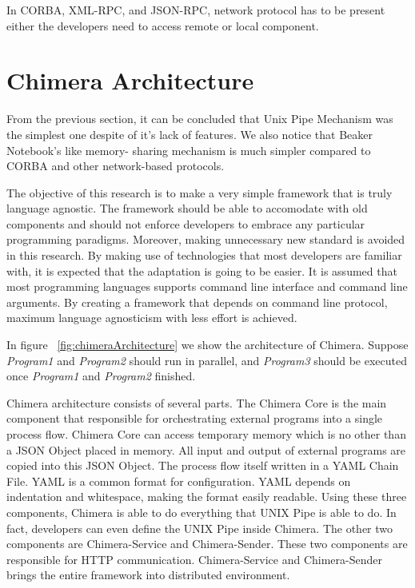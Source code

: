 \documentclass[conference]{IEEEtran}
\begin{document}
In CORBA, XML-RPC, and JSON-RPC, network protocol has to be present either the developers need to access 
remote or local component.


\section{Chimera Architecture}

From the previous section, it can be concluded that Unix Pipe Mechanism was the simplest one
despite of it's lack of features. We also notice that Beaker Notebook's like memory-
sharing mechanism is much simpler compared to CORBA and other network-based protocols.

The objective of this research is to make a very simple framework that is truly language agnostic. The framework
should be able to accomodate with old components and should not enforce developers to embrace any 
particular programming paradigms. Moreover, making unnecessary new standard is avoided in this research.
By making use of technologies that most developers are familiar with, it is expected that the adaptation is
going to be easier. It is assumed that most programming languages supports command line interface and
command line arguments. By creating a framework that depends on command line protocol,
maximum language agnosticism with less effort is achieved.

In figure ~\ref{fig:chimeraArchitecture} we show the architecture of Chimera. Suppose
{\it Program1} and {\it Program2} should run in parallel, and {\it Program3} should be
executed once {\it Program1} and {\it Program2} finished.

Chimera architecture consists of several parts. The Chimera Core is the main component 
that responsible for orchestrating external programs into a single process flow. 
Chimera Core can access temporary memory which is no other than a JSON Object placed in
memory. All input and output of external programs are copied into this JSON Object.
The process flow itself written in a YAML Chain File. YAML is a common format for
configuration. YAML depends on indentation and whitespace, making the format easily 
readable. Using these three components, Chimera is able to do everything that UNIX Pipe is able to do. 
In fact, developers can even define the UNIX Pipe inside Chimera. The other two components are Chimera-Service and Chimera-Sender. These two components are responsible for HTTP communication. Chimera-Service and Chimera-Sender brings the 
entire framework into distributed environment.
\end{document}
